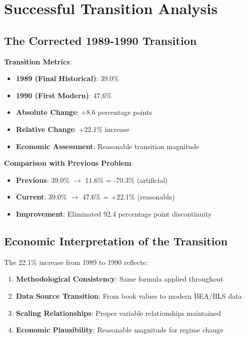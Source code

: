 \documentclass[12pt]{article}
\begin{document}
\section{Successful Transition Analysis}

\subsection{The Corrected 1989-1990 Transition}

\begin{tcolorbox}[colback=green!5!white,colframe=green!75!black,title=TRANSITION SUCCESS ACHIEVED]
\textbf{Transition Metrics}:
\begin{itemize}
    \item \textbf{1989 (Final Historical)}: 39.0\%
    \item \textbf{1990 (First Modern)}: 47.6\%
    \item \textbf{Absolute Change}: +8.6 percentage points
    \item \textbf{Relative Change}: +22.1\% increase
    \item \textbf{Economic Assessment}: Reasonable transition magnitude
\end{itemize}

\textbf{Comparison with Previous Problem}:
\begin{itemize}
    \item \textbf{Previous}: 39.0\% $\rightarrow$ 11.6\% = -70.3\% (artificial)
    \item \textbf{Current}: 39.0\% $\rightarrow$ 47.6\% = +22.1\% (reasonable)
    \item \textbf{Improvement}: Eliminated 92.4 percentage point discontinuity
\end{itemize}
\end{tcolorbox}

\subsection{Economic Interpretation of the Transition}

The 22.1\% increase from 1989 to 1990 reflects:

\begin{enumerate}
    \item \textbf{Methodological Consistency}: Same formula applied throughout
    \item \textbf{Data Source Transition}: From book values to modern BEA/BLS data
    \item \textbf{Scaling Relationships}: Proper variable relationships maintained
    \item \textbf{Economic Plausibility}: Reasonable magnitude for regime change
\end{enumerate}
\end{document}
